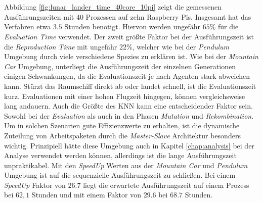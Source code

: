 \\\\
Abbildung \ref{fig:lunar_lander_time_40core_10pi} zeigt die gemessenen Ausführungszeiten mit $40$ Prozessen auf zehn Raspberry Pis. Insgesamt hat das Verfahren etwa $3.5$ Stunden benötigt. Hiervon werden ungefähr $65\%$ für die \emph{Evaluation Time} verwendet. Der zweit größte Faktor bei der Ausführungszeit ist die \emph{Reproduction Time} mit ungefähr $22\%$, welcher wie bei der \emph{Pendulum} Umgebung durch viele verschiedene Spezies zu erklären ist. Wie bei der \emph{Mountain Car} Umgebung, unterliegt die Ausführungszeit der einzelnen Generationen einigen Schwankungen, da die Evaluationszeit je nach Agenten stark abweichen kann. Stürzt das Raumschiff direkt ab oder landet schnell, ist die Evaluationszeit kurz. Evaluationen mit einer hohen Flugzeit hingegen, können vergleichsweise lang andauern. Auch die Größte des \ac{KNN} kann eine entscheidender Faktor sein. Sowohl bei der \emph{Evaluation} als auch in den Phasen \emph{Mutation} und \emph{Rekombination}. Um in solchen Szenarien gute Effizienzwerte zu erhalten, ist die dynamische Zuteilung von Arbeitspaketen durch die \emph{Master-Slave} Architektur besonders wichtig. Prinzipiell hätte diese Umgebung auch in Kapitel \ref{chap:analysis} bei der Analyse verwendet werden können, allerdings ist die lange Ausführungszeit unpraktikabel. Mit den \emph{SpeedUp} Werten aus der \emph{Mountain Car} und \emph{Pendulum} Umgebung ist auf die sequenzielle Ausführungszeit zu schließen. Bei einem \emph{SpeedUp} Faktor von $26.7$ liegt die erwartete Ausführungszeit auf einem Prozess bei $62,1$ Stunden und mit einem Faktor von $29.6$ bei $68.7$ Stunden. 